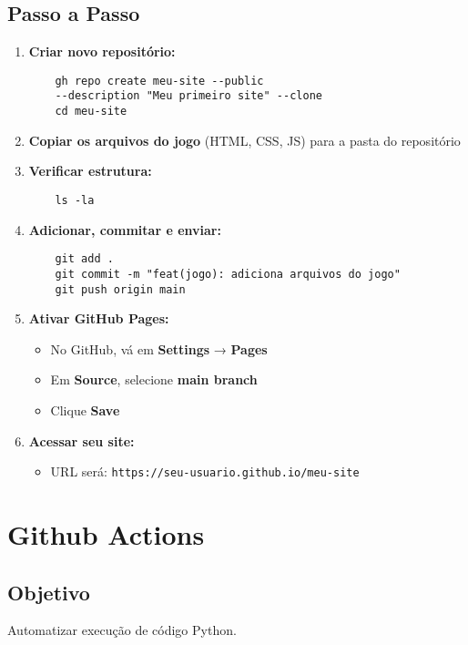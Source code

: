 \subsection{Passo a Passo}
\begin{enumerate}
    \item \textbf{Criar novo repositório:}
    \begin{verbatim}
    gh repo create meu-site --public 
    --description "Meu primeiro site" --clone
    cd meu-site
    \end{verbatim}
    
    \item \textbf{Copiar os arquivos do jogo} (HTML, CSS, JS) para a pasta do repositório
    
    \item \textbf{Verificar estrutura:}
    \begin{verbatim}
    ls -la
    \end{verbatim}
    
    \item \textbf{Adicionar, commitar e enviar:}
    \begin{verbatim}
    git add .
    git commit -m "feat(jogo): adiciona arquivos do jogo"
    git push origin main
    \end{verbatim}
    
    \item \textbf{Ativar GitHub Pages:}
    \begin{itemize}
        \item No GitHub, vá em \textbf{Settings} → \textbf{Pages}
        \item Em \textbf{Source}, selecione \textbf{main branch}
        \item Clique \textbf{Save}
    \end{itemize}
    
    \item \textbf{Acessar seu site:}
    \begin{itemize}
        \item URL será: \texttt{https://seu-usuario.github.io/meu-site}
    \end{itemize}
\end{enumerate}

\section{Github Actions}

\subsection{Objetivo}
Automatizar execução de código Python.

